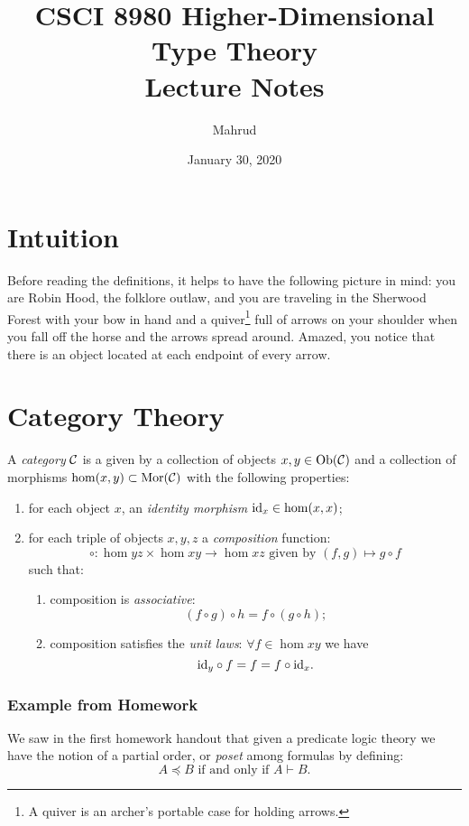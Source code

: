 \documentclass[11pt]{article}
\title{CSCI 8980 Higher-Dimensional Type Theory\\ Lecture Notes}
\author{Mahrud}
\date{January 30, 2020}
\theoremstyle{definition}
\begin{document}
\maketitle

\section{Intuition}

Before reading the definitions, it helps to have the following picture in mind:
you are Robin Hood, the folklore outlaw, and you are traveling in the Sherwood Forest with your bow in hand and a quiver\footnote{A quiver is an archer's portable case for holding arrows.} full of arrows on your shoulder when you fall off the horse and the arrows spread around. Amazed, you notice that there is an object located at each endpoint of every arrow.

\section{Category Theory}

A \textit{category} $\mathcal{C}$ is a given by a collection of objects $x,y\in\mathrm{Ob}(\mathcal{C})$ and a collection of morphisms $\mathrm{hom}(x, y)\subset\mathrm{Mor}(\mathcal{C})$ with the following properties:

\begin{enumerate}
\item for each object $x$, an \textit{identity morphism} $\mathrm{id}_x\in\mathrm{hom}(x, x)$;
\item for each triple of objects $x,y,z$ a \textit{composition} function:
  \[ \circ:\hom{y}{z} \times \hom{x}{y} \to \hom{x}{z} \text{ given by } (f,g) \mapsto g\circ f \]
  such that:
  \begin{enumerate}
  \item composition is \textit{associative}:
    \[ (f\circ g)\circ h = f\circ(g\circ h); \]
  \item composition satisfies the \textit{unit laws}: $\forall f\in\hom{x}{y}$ we have
    \[ \mathrm{id}_y \circ f = f = f \circ \mathrm{id}_x . \]
  \end{enumerate}
\end{enumerate}

\subsubsection{Example from Homework}

We saw in the first homework handout that given a predicate logic theory we have the notion of a partial order, or \textit{poset} among formulas by defining:
\[ A \preceq B \text{ if and only if } A \vdash B. \]
\end{document}
